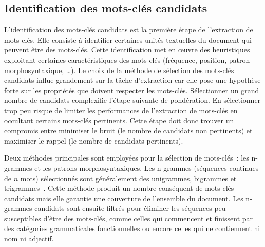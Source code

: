 \subsection{Identification des mots-clés candidats}\label{selection-des-mots-cles-candidats}

L'identification des mots-clés candidats est la première étape de l'extraction de mots-clés. Elle consiste à identifier certaines unités textuelles du document qui peuvent être des mots-clés.
Cette identification met en \oe{}uvre des heuristiques exploitant certaines caractéristiques des mots-clés (fréquence, position, patron morphosyntaxique, \ldots).
Le choix de la méthode de sélection des mots-clés candidats influe grandement sur la tâche d'extraction car elle pose une hypothèse forte sur les propriétés que doivent respecter les mots-clés.
Sélectionner un grand nombre de candidats complexifie l'étape suivante de pondération. En sélectionner trop peu risque de limiter les performances de l'extraction de mots-clés en occultant certains mots-clés pertinents.
Cette étape doit donc trouver un compromis entre minimiser le bruit (le nombre de candidats non pertinents) et maximiser le rappel (le nombre de candidats pertinents).


Deux  méthodes principales sont employées pour la sélection de mots-clés~: les n-grammes et les patrons morphosyntaxiques.
Les n-grammes (séquences continues de $n$ mots) sélectionnés sont  généralement des unigrammes, bigrammes et trigrammes~\cite{witten_kea:_1999,campos_yake_2020}. Cette méthode produit un nombre conséquent de mots-clés candidats mais elle garantie une couverture de l'ensemble du document.
Les n-grammes candidats sont ensuite filtrés pour éliminer les séquences peu susceptibles d'être des mots-clés, comme celles qui commencent et finissent par des catégories grammaticales fonctionnelles ou encore celles qui ne contiennent ni nom ni adjectif.

